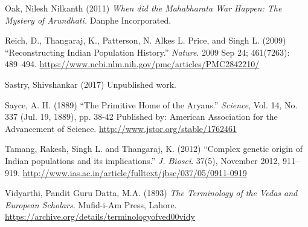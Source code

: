 \begin{thebibliography}{99}
  Oak, Nilesh Nilkanth (2011) \textit{When did the Mahabharata War Happen: The Mystery of Arundhati.} Danphe Incorporated.

  Reich, D., Thangaraj, K., Patterson, N. Alkes L. Price, and Singh L. (2009) “Reconstructing Indian Population History.” \textit{Nature}. 2009 Sep 24; 461(7263): 489–494. \url{https://www.ncbi.nlm.nih.gov/pmc/articles/PMC2842210/}

  Sastry, Shivshankar (2017) Unpublished work.

  Sayce, A. H. (1889) “The Primitive Home of the Aryans.” \textit{Science}, Vol. 14, No. 337 (Jul. 19, 1889), pp. 38-42 Published by: American Association for the Advancement of Science. \url{http://www.jstor.org/stable/1762461}

  Tamang, Rakesh, Singh L. and Thangaraj, K. (2012) “Complex genetic origin of Indian populations and its implications.” \textit{J. Biosci}. 37(5), November 2012, 911–919. \url{http://www.ias.ac.in/article/fulltext/jbsc/037/05/0911-0919}

  Vidyarthi, Pandit Guru Datta, M.A. (1893) \textit{The Terminology of the Vedas and European Scholars.} Mufid-i-Am Press, Lahore. \url{https://archive.org/details/terminologyofved00vidy}

 \end{thebibliography}

